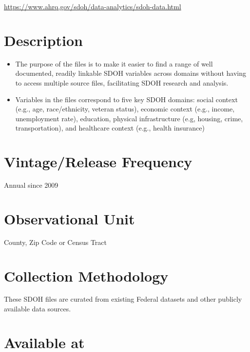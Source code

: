\documentclass[
]{book}
\providecommand{\tightlist}{%
  \setlength{\itemsep}{0pt}\setlength{\parskip}{0pt}}
\begin{document}
\url{https://www.ahrq.gov/sdoh/data-analytics/sdoh-data.html}

\hypertarget{description-80}{%
\section{Description}\label{description-80}}

\begin{itemize}
\tightlist
\item
  The purpose of the files is to make it easier to find a range of well documented, readily linkable SDOH variables across domains without having to access multiple source files, facilitating SDOH research and analysis.
\item
  Variables in the files correspond to five key SDOH domains: social context (e.g., age, race/ethnicity, veteran status), economic context (e.g., income, unemployment rate), education, physical infrastructure (e.g, housing, crime, transportation), and healthcare context (e.g., health insurance)
\end{itemize}

\hypertarget{vintagerelease-frequency-80}{%
\section{Vintage/Release Frequency}\label{vintagerelease-frequency-80}}

Annual since 2009

\hypertarget{observational-unit-80}{%
\section{Observational Unit}\label{observational-unit-80}}

County, Zip Code or Census Tract

\hypertarget{collection-methodology-80}{%
\section{Collection Methodology}\label{collection-methodology-80}}

These SDOH files are curated from existing Federal datasets and other publicly available data sources.

\hypertarget{available-at-80}{%
\section{Available at}\label{available-at-80}}
\end{document}
